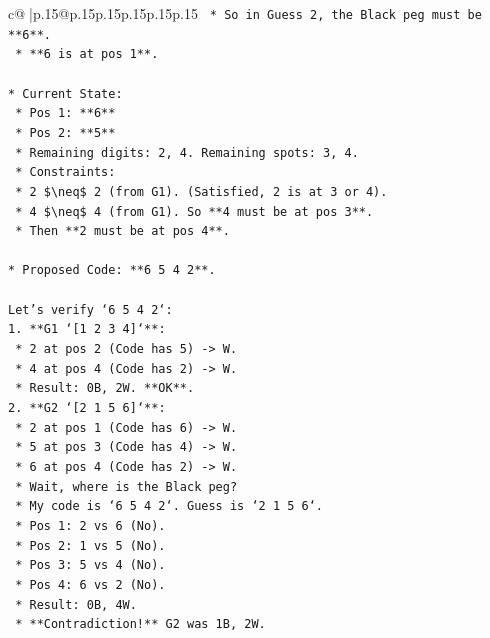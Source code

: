\documentclass{article}
\begin{document}
{\begin{supertabular}{c@{$\;$}|p{.15\linewidth}@{}p{.15\linewidth}p{.15\linewidth}p{.15\linewidth}p{.15\linewidth}p{.15\linewidth}}
{{{\texttt{    *   So in Guess 2, the Black peg must be **6**.} \\
\texttt{    *   **6 is at pos 1**.} \\
\\ 
\texttt{*   Current State:} \\
\texttt{    *   Pos 1: **6**} \\
\texttt{    *   Pos 2: **5**} \\
\texttt{    *   Remaining digits: 2, 4. Remaining spots: 3, 4.} \\
\texttt{    *   Constraints:} \\
\texttt{        *   2 \$\textbackslash{}neq\$ 2 (from G1). (Satisfied, 2 is at 3 or 4).} \\
\texttt{        *   4 \$\textbackslash{}neq\$ 4 (from G1). So **4 must be at pos 3**.} \\
\texttt{        *   Then **2 must be at pos 4**.} \\
\\ 
\texttt{*   Proposed Code: **6 5 4 2**.} \\
\\ 
\texttt{Let's verify `6 5 4 2`:} \\
\texttt{1.  **G1 `{[}1 2 3 4{]}`**:} \\
\texttt{    *   2 at pos 2 (Code has 5) {-}> W.} \\
\texttt{    *   4 at pos 4 (Code has 2) {-}> W.} \\
\texttt{    *   Result: 0B, 2W. **OK**.} \\
\texttt{2.  **G2 `{[}2 1 5 6{]}`**:} \\
\texttt{    *   2 at pos 1 (Code has 6) {-}> W.} \\
\texttt{    *   5 at pos 3 (Code has 4) {-}> W.} \\
\texttt{    *   6 at pos 4 (Code has 2) {-}> W.} \\
\texttt{    *   Wait, where is the Black peg?} \\
\texttt{    *   My code is `6 5 4 2`. Guess is `2 1 5 6`.} \\
\texttt{    *   Pos 1: 2 vs 6 (No).} \\
\texttt{    *   Pos 2: 1 vs 5 (No).} \\
\texttt{    *   Pos 3: 5 vs 4 (No).} \\
\texttt{    *   Pos 4: 6 vs 2 (No).} \\
\texttt{    *   Result: 0B, 4W.} \\
\texttt{    *   **Contradiction!** G2 was 1B, 2W.} \\
}}}
\end{supertabular}}
\end{document}
